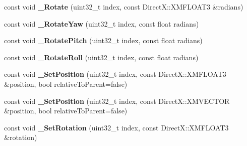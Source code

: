 \begin{DoxyCompactItemize}
\item 
const void {\bfseries \+\_\+\+Rotate} (uint32\+\_\+t index, const Direct\+X\+::\+X\+M\+F\+L\+O\+A\+T3 \&radians)\hypertarget{class_ensum_1_1_components_1_1_transform_manager_a94e359a45bfaa598f8c08b9e31cc8025}{}\label{class_ensum_1_1_components_1_1_transform_manager_a94e359a45bfaa598f8c08b9e31cc8025}

\item 
const void {\bfseries \+\_\+\+Rotate\+Yaw} (uint32\+\_\+t index, const float radians)\hypertarget{class_ensum_1_1_components_1_1_transform_manager_a54777efdcd5b6d082cc20147c21e5348}{}\label{class_ensum_1_1_components_1_1_transform_manager_a54777efdcd5b6d082cc20147c21e5348}

\item 
const void {\bfseries \+\_\+\+Rotate\+Pitch} (uint32\+\_\+t index, const float radians)\hypertarget{class_ensum_1_1_components_1_1_transform_manager_ae46a70a55aa5f080b15f2290633f243d}{}\label{class_ensum_1_1_components_1_1_transform_manager_ae46a70a55aa5f080b15f2290633f243d}

\item 
const void {\bfseries \+\_\+\+Rotate\+Roll} (uint32\+\_\+t index, const float radians)\hypertarget{class_ensum_1_1_components_1_1_transform_manager_a64bbc7d142674869532b422c57b31a11}{}\label{class_ensum_1_1_components_1_1_transform_manager_a64bbc7d142674869532b422c57b31a11}

\item 
const void {\bfseries \+\_\+\+Set\+Position} (uint32\+\_\+t index, const Direct\+X\+::\+X\+M\+F\+L\+O\+A\+T3 \&position, bool relative\+To\+Parent=false)\hypertarget{class_ensum_1_1_components_1_1_transform_manager_a830889e8aa1ab8dd5c84c1da08a65eca}{}\label{class_ensum_1_1_components_1_1_transform_manager_a830889e8aa1ab8dd5c84c1da08a65eca}

\item 
const void {\bfseries \+\_\+\+Set\+Position} (uint32\+\_\+t index, const Direct\+X\+::\+X\+M\+V\+E\+C\+T\+OR \&position, bool relative\+To\+Parent=false)\hypertarget{class_ensum_1_1_components_1_1_transform_manager_a77609ace7a0622232b84a60d236fb75c}{}\label{class_ensum_1_1_components_1_1_transform_manager_a77609ace7a0622232b84a60d236fb75c}

\item 
const void {\bfseries \+\_\+\+Set\+Rotation} (uint32\+\_\+t index, const Direct\+X\+::\+X\+M\+F\+L\+O\+A\+T3 \&rotation)\hypertarget{class_ensum_1_1_components_1_1_transform_manager_a802d57c893c0c261b3f12702ab52943f}{}\label{class_ensum_1_1_components_1_1_transform_manager_a802d57c893c0c261b3f12702ab52943f}


\end{DoxyCompactItemize}
